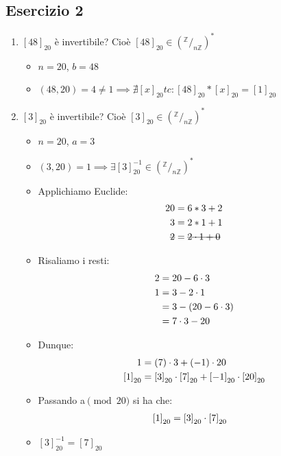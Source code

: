 \documentclass[10pt]{article}
\begin{document}
  \subsection{Esercizio 2}
	\begin{enumerate}
	\item
	$\left[48\right]_{20}$ è invertibile? Cioè $\displaystyle{\left[48\right]_{20} \in \left(^\mathbb{Z}/_{n \mathbb{Z}}\right)^*}$
	\begin{itemize}
	\item
	$n=20$, $b=48$
	\item
	$\displaystyle{(48,20) = 4 \neq 1 \implies \nexists \left[x\right]_{20} tc: \left[48\right]_{20} * \left[x\right]_{20} = \left[1\right]_{20}}$
	\end{itemize}
	\item
	$\left[3\right]_{20}$ è invertibile? Cioè $\displaystyle{\left[3\right]_{20} \in \left(^\mathbb{Z}/_{n \mathbb{Z}}\right)^*}$
	\begin{itemize}
	\item
	$n=20$, $a=3$
	\item
	$\displaystyle{(3,20) = 1 \implies \exists \left[3\right]_{20}^{-1} \in \left(^\mathbb{Z}/_{n \mathbb{Z}}\right)^*}$
	\item
	Applichiamo Euclide:
	\begin{equation}
	\begin{split}
	20 &= 6*3 + 2 \\
	3 &= 2*1 + 1 \\
	\hbox{\sout{$2$}} &= \hbox{\sout{$2 \cdot 1 + 0$}}
	\notag
	\end{split}
	\end{equation}
	\item
	Risaliamo i resti:
	\begin{equation}
	\begin{split}
	2 &= 20 - 6 \cdot 3 \\
	1 &= 3 - 2 \cdot 1 \\
	&= 3 - (20 - 6 \cdot 3) \\
	&= 7 \cdot 3 - 20
	\notag
	\end{split}
	\end{equation}
	\item
	Dunque:
	\begin{equation}
	\begin{split}
	1 &= (7) \cdot 3 + (-1) \cdot 20 \\
	\left[1\right]_{20} &= \left[3\right]_{20} \cdot \left[7\right]_{20} + \left[-1\right]_{20} \cdot \left[20\right]_{20}
	\notag
	\end{split}
	\end{equation}
	\item
	Passando a$\pmod{20}$ si ha che:
	\begin{equation}
	\begin{split}
	\left[1\right]_{20} &= \left[3\right]_{20} \cdot \left[7\right]_{20}
	\notag
	\end{split}
	\end{equation}
	\item
	$\left[3\right]_{20}^{-1} = \left[7\right]_{20}$
	\end{itemize}
	\end{enumerate}
	
\end{document}
